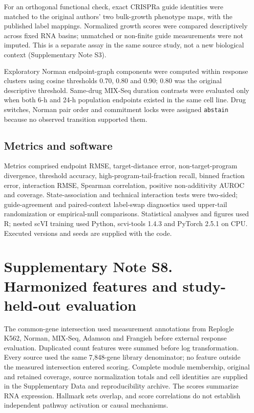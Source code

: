 \documentclass[a4paper,fleqn]{cas-sc}
\makeatletter
\DeclareRobustCommand{\rev}[1]{{\color{red}\def\@citecolor{black}\def\@linkcolor{red}\def\@urlcolor{red}#1}}
\let\unmarkedcite\cite
\renewcommand{\cite}[1]{{\color{black}\def\@citecolor{black}\unmarkedcite{#1}}}
\makeatother
\begin{document}
For an orthogonal functional check, exact CRISPRa guide identities were matched to the original authors' two bulk-growth phenotype maps, with the published label mappings. Normalized growth scores were compared descriptively across fixed RNA basins; unmatched or non-finite guide measurements were not imputed. This is a separate assay in the same source study, not a new biological context (Supplementary Note S3).\cite{norman2019}

\rev{Exploratory Norman endpoint-graph components were computed within response clusters using cosine thresholds 0.70, 0.80 and 0.90; 0.80 was the original descriptive threshold.} Same-drug MIX-Seq duration contrasts were evaluated only when both 6-h and 24-h population endpoints existed in the same cell line. Drug switches, Norman pair order and commitment locks were assigned \texttt{abstain} because no observed transition supported them.

\subsection*{Metrics and software}

\rev{Metrics comprised endpoint RMSE, target-distance error, non-target-program divergence, threshold accuracy, high-program-tail-fraction recall, binned fraction error, interaction RMSE, Spearman correlation, positive non-additivity AUROC and coverage.} State-association and technical interaction tests were two-sided; guide-agreement and paired-context label-swap diagnostics used upper-tail randomization or empirical-null comparisons. Statistical analyses and figures used R; nested scVI training used Python, scvi-tools 1.4.3 and PyTorch 2.5.1 on CPU. Executed versions and seeds are supplied with the code.


\clearpage
\section*{\rev{Supplementary Note S8. Harmonized features and study-held-out evaluation}}

\rev{The common-gene intersection used measurement annotations from Replogle K562, Norman, MIX-Seq, Adamson and Frangieh before external response evaluation.} \rev{Duplicated count features were summed before log transformation.} \rev{Every source used the same 7,848-gene library denominator; no feature outside the measured intersection entered scoring.} \rev{Complete module membership, original and retained coverage, source normalization totals and cell identities are supplied in the Supplementary Data and reproducibility archive.} \rev{The scores summarize RNA expression.} \rev{Hallmark sets overlap, and score correlations do not establish independent pathway activation or causal mechanisms.}
\end{document}
